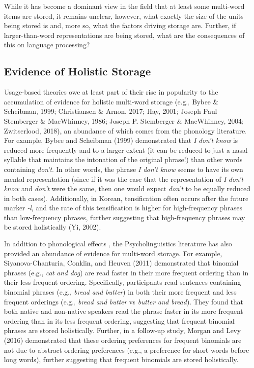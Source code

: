 \documentclass[
  man,floatsintext]{apa6}
\begin{document}
While it has become a dominant view in the field that at least some multi-word items are stored, it remains unclear, however, what exactly the size of the units being stored is and, more so, what the factors driving storage are. Further, if larger-than-word representations are being stored, what are the consequences of this on language processing?

\hypertarget{evidence-of-holistic-storage}{%
\subsection{Evidence of Holistic Storage}\label{evidence-of-holistic-storage}}

Usage-based theories owe at least part of their rise in popularity to the accumulation of evidence for holistic multi-word storage (e.g., Bybee \& Scheibman, 1999; Christiansen \& Arnon, 2017; Hay, 2001; Joseph Paul Stemberger \& MacWhinney, 1986; Joseph P. Stemberger \& MacWhinney, 2004; Zwitserlood, 2018), an abundance of which comes from the phonology literature. For example, Bybee and Scheibman (1999) demonstrated that \emph{I don't know} is reduced more frequently and to a larger extent (it can be reduced to just a nasal syllable that maintains the intonation of the original phrase!) than other words containing \emph{don't}. In other words, the phrase \emph{I don't know} seems to have its own mental representation (since if it was the case that the representation of \emph{I don't know} and \emph{don't} were the same, then one would expect \emph{don't} to be equally reduced in both cases). Additionally, in Korean, tensification often occurs after the future marker \emph{-l}, and the rate of this tensification is higher for high-frequency phrases than low-frequency phrases, further suggesting that high-frequency phrases may be stored holistically (Yi, 2002).

In addition to phonological effects , the Psycholinguistics literature has also provided an abundance of evidence for multi-word storage. For example, Siyanova-Chanturia, Conklin, and Heuven (2011) demonstrated that binomial phrases (e.g., \emph{cat and dog}) are read faster in their more frequent ordering than in their less frequent ordering. Specifically, participants read sentences containing binomial phrases (e.g., \emph{bread and butter}) in both their more frequent and less frequent orderings (e.g., \emph{bread and butter} vs \emph{butter and bread}). They found that both native and non-native speakers read the phrase faster in its more frequent ordering than in its less frequent ordering, suggesting that frequent binomial phrases are stored holistically. Further, in a follow-up study, Morgan and Levy (2016) demonstrated that these ordering preferences for frequent binomials are not due to abstract ordering preferences (e.g., a preference for short words before long words), further suggesting that frequent binomials are stored holistically.
\end{document}
